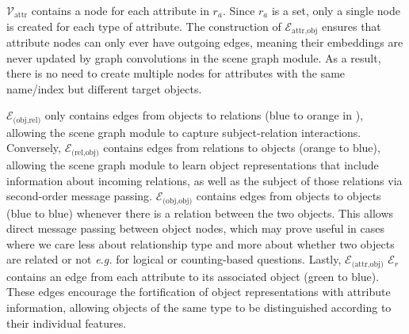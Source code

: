 \(\mathcal{V}_\text{attr}\) contains a node for each attribute in \(r_a\). Since \(r_a\) is a set, only a single node is created for each type of attribute. The construction of \(\mathcal{E}_\text{attr,obj}\) ensures that attribute nodes can only ever have outgoing edges, meaning their embeddings are never updated by graph convolutions in the scene graph module. As a result, there is no need to create multiple nodes for attributes with the same name/index but different target objects.

\(\mathcal{E}_{\text{(obj,rel)}}\) only contains edges from objects to relations (blue to orange in \figureautorefname{ \ref{fig:scene_graph_construction}}), allowing the scene graph module to capture subject-relation interactions. Conversely, \(\mathcal{E}_{\text{(rel,obj)}}\) contains edges from relations to objects (orange to blue), allowing the scene graph module to learn object representations that include information about incoming relations, as well as the subject of those relations via second-order message passing. \(\mathcal{E}_{\text{(obj,obj)}}\) contains edges from objects to objects (blue to blue) whenever there is a relation between the two objects. This allows direct message passing between object nodes, which may prove useful in cases where we care less about relationship type and more about whether two objects are related or not \textit{e.g.} for logical or counting-based questions. Lastly, \(\mathcal{E}_{\text{(attr,obj)}}\) \(\mathcal{E}_r\) contains an edge from each attribute to its associated object (green to blue). These edges encourage the fortification of object representations with attribute information, allowing objects of the same type to be distinguished according to their individual features.

